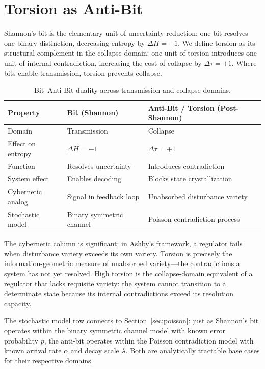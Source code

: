 \documentclass[11pt]{article}
\theoremstyle{plain}
\begin{document}
\section{Torsion as Anti-Bit}

Shannon's bit is the elementary unit of uncertainty reduction: one bit resolves one binary
distinction, decreasing entropy by $\Delta H = -1$. We define torsion as its structural complement
in the collapse domain: one unit of torsion introduces one unit of internal contradiction,
increasing the cost of collapse by $\Delta\tau = +1$. Where bits enable transmission, torsion
prevents collapse.

\begin{table}[h]
\centering
\caption{Bit--Anti-Bit duality across transmission and collapse domains.}
\begin{tabular}{lll}
\toprule
\textbf{Property} & \textbf{Bit (Shannon)} & \textbf{Anti-Bit / Torsion (Post-Shannon)} \\
\midrule
Domain            & Transmission              & Collapse \\
Effect on entropy & $\Delta H = -1$           & $\Delta\tau = +1$ \\
Function          & Resolves uncertainty      & Introduces contradiction \\
System effect     & Enables decoding          & Blocks state crystallization \\
Cybernetic analog & Signal in feedback loop   & Unabsorbed disturbance variety \\
Stochastic model  & Binary symmetric channel  & Poisson contradiction process \\
\bottomrule
\end{tabular}
\end{table}

The cybernetic column is significant: in Ashby's framework, a regulator fails when disturbance
variety exceeds its own variety. Torsion is precisely the information-geometric measure of
unabsorbed variety---the contradictions a system has not yet resolved. High torsion is the
collapse-domain equivalent of a regulator that lacks requisite variety: the system cannot
transition to a determinate state because its internal contradictions exceed its resolution
capacity.

The stochastic model row connects to Section~\ref{sec:poisson}: just as Shannon's bit operates
within the binary symmetric channel model with known error probability $p$, the anti-bit operates
within the Poisson contradiction model with known arrival rate $\alpha$ and decay scale $\lambda$.
Both are analytically tractable base cases for their respective domains.
\end{document}
